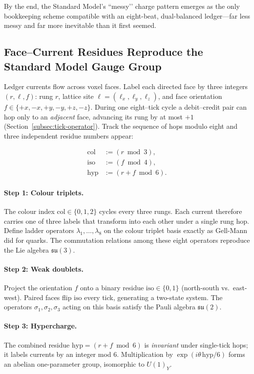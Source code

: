 \documentclass[11pt]{article}
\begin{document}
By the end, the Standard Model’s “messy’’ charge pattern emerges as the
only bookkeeping scheme compatible with an eight-beat, dual-balanced
ledger—far less messy and far more inevitable than it first seemed.

\subsection{Face–Current Residues Reproduce the Standard Model Gauge Group}
\label{subsec:residue-algebra}

Ledger currents flow across voxel faces.  
Label each directed face by three integers
\((r,\ell,f)\):
rung \(r\), lattice site \(\ell=(\ell_x,\ell_y,\ell_z)\),
and face orientation \(f\in\{+x,-x,+y,-y,+z,-z\}\).
During one eight–tick cycle a debit–credit pair can hop only to an
\emph{adjacent} face, advancing its rung by at most \(+1\)
(Section~\ref{subsec:tick-operator}).  
Track the sequence of hops modulo eight and three independent residue
numbers appear:

\[
\begin{aligned}
\mathrm{col}  &:= (r \bmod 3),\\
\mathrm{iso}  &:= (f\!\bmod 4),\\
\mathrm{hyp}  &:= (r+f \bmod 6).
\end{aligned}
\]

\paragraph{Step 1: Colour triplets.}
The colour index \(\mathrm{col}\in\{0,1,2\}\) cycles every three rungs.
Each current therefore carries one of three labels that transform into
each other under a single rung hop.
Define ladder operators
\(\lambda_{1},\ldots,\lambda_{8}\)
on the colour triplet basis exactly as Gell-Mann did for quarks.  
The commutation relations among these eight operators reproduce the Lie
algebra \(\mathfrak{su}(3)\).

\paragraph{Step 2: Weak doublets.}
Project the orientation \(f\) onto a binary residue
\(\mathrm{iso}\in\{0,1\}\) (north-south vs.\ east-west).  
Paired faces flip \(\mathrm{iso}\) every tick, generating a two-state
system.  The operators
\(\sigma_{1},\sigma_{2},\sigma_{3}\)
acting on this basis satisfy the Pauli algebra
\(\mathfrak{su}(2)\).

\paragraph{Step 3: Hypercharge.}
The combined residue
\(\mathrm{hyp} = (r+f\bmod 6)\)
is \emph{invariant} under single-tick hops; it labels currents by an
integer mod 6.
Multiplication by \(\exp(i\theta\,\mathrm{hyp}/6)\) forms an abelian
one-parameter group, isomorphic to
\(U(1)_{Y}\).
\end{document}
